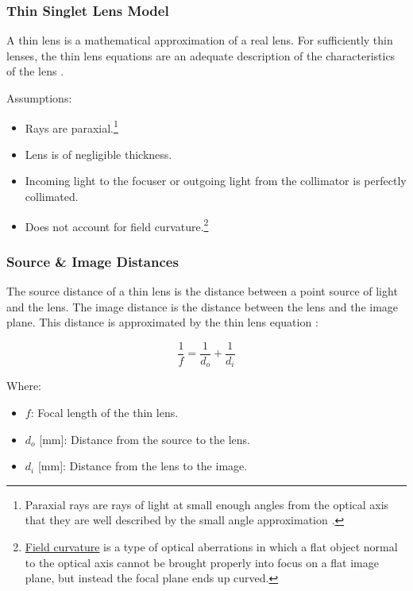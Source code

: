 \documentclass{article}
\begin{document}
\subsubsection{Thin Singlet Lens Model} \label{sec:thin-singlet-model}

A thin lens is a mathematical approximation of a real lens. For sufficiently thin lenses, the thin lens equations are an adequate description of the characteristics of the lens \cite{Boundless_undated-to}.

Assumptions:
\begin{itemize}
    \item Rays are paraxial.\footnote{Paraxial rays are rays of light at small enough angles from the optical axis that they are well described by the small angle approximation \cite{noauthor_undated-wt}.} 
    
    \item Lens is of negligible thickness.
    
    \item Incoming light to the focuser or outgoing light from the collimator is perfectly collimated.
    
    \item Does not account for field curvature.\footnote{\href{https://en.wikipedia.org/wiki/Petzval_field_curvature}{Field curvature} is a type of optical aberrations in which a flat object normal to the optical axis cannot be brought properly into focus on a flat image plane, but instead the focal plane ends up curved.}
\end{itemize}

\subsubsection{Source \& Image Distances} \label{sec:thin-object-image-distances}
The source distance of a thin lens is the distance between a point source of light and the lens. The image distance is the distance between the lens and the image plane. This distance is approximated by the thin lens equation \cite{noauthor_undated-zn}:

\begin{equation} \label{eq:thin-lens}
    \frac{1}{f} = \frac{1}{d_o} + \frac{1}{d_i}
\end{equation}

Where:
\begin{itemize}[label={}]
    \item $f$: Focal length of the thin lens.
    \item $d_o$ [\si{\mm}]: Distance from the source to the lens.
    \item $d_i$ [\si{\mm}]: Distance from the lens to the image.
\end{itemize}
\end{document}
